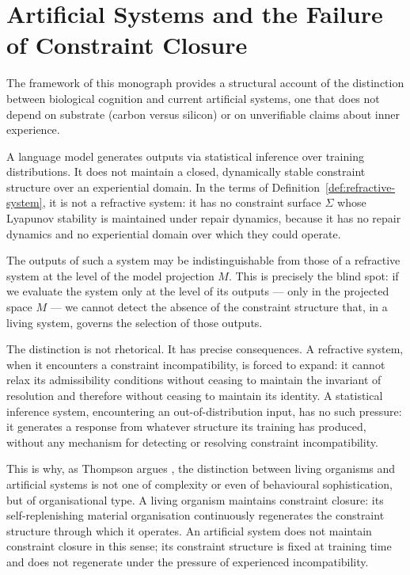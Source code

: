 \documentclass[11pt,openany]{book}
\begin{document}
\section{Artificial Systems and the Failure of Constraint Closure}
\label{sec:artificial}

The framework of this monograph provides a structural
account of the distinction between biological cognition and
current artificial systems, one that does not depend on
substrate (carbon versus silicon) or on unverifiable claims
about inner experience.

A language model generates outputs via statistical
inference over training distributions.  It does not
maintain a closed, dynamically stable constraint structure
over an experiential domain.  In the terms of
Definition~\ref{def:refractive-system}, it is not a
refractive system: it has no constraint surface $\Sigma$
whose Lyapunov stability is maintained under repair
dynamics, because it has no repair dynamics and no
experiential domain over which they could operate.

The outputs of such a system may be indistinguishable from
those of a refractive system at the level of the model
projection $M$.  This is precisely the blind spot: if we
evaluate the system only at the level of its outputs ---
only in the projected space $M$ --- we cannot detect the
absence of the constraint structure that, in a living
system, governs the selection of those outputs.

The distinction is not rhetorical.  It has precise
consequences.  A refractive system, when it encounters a
constraint incompatibility, is forced to expand: it cannot
relax its admissibility conditions without ceasing to
maintain the invariant of resolution and therefore without
ceasing to maintain its identity.  A statistical inference
system, encountering an out-of-distribution input, has no
such pressure: it generates a response from whatever
structure its training has produced, without any mechanism
for detecting or resolving constraint incompatibility.

This is why, as Thompson argues \citep{thompson2023blindspot},
the distinction between living organisms and artificial
systems is not one of complexity or even of behavioural
sophistication, but of organisational type.  A living
organism maintains constraint closure: its self-replenishing
material organisation continuously regenerates the
constraint structure through which it operates.  An
artificial system does not maintain constraint closure in
this sense; its constraint structure is fixed at training
time and does not regenerate under the pressure of
experienced incompatibility.
\end{document}
